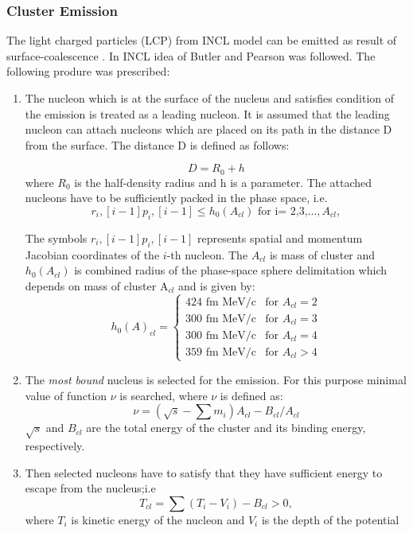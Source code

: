 \subsubsection{Cluster Emission}
The light charged particles (LCP) from INCL model can be emitted as result of  surface-coalescence \cite{INCLboudard2013new}. In INCL idea of  Butler and Pearson\cite{Butler1963} was followed. The following produre was prescribed:
\begin{enumerate}[label=(\roman*)]
	
	\item The nucleon which is at the surface of the nucleus and satisfies condition of the emission is treated as a leading nucleon. It is assumed that the leading nucleon can attach nucleons which are placed on its path in the distance D from the surface. The distance D is defined as follows:
	
	\begin{equation}
		D=R_{0}+h
	\end{equation} 
	where $R_{0}$ is the half-density radius and h is a parameter. The attached nucleons have to be sufficiently packed in the phase space, i.e. 
	\begin{equation}
		r_i,[i-1]p_i,[i-1]\leq h_0\left(A_{cl}\right) \text{  for i= 2,3,}..., A_{cl},
	\end{equation} 
	
	The symbols $r_i,[i-1]p_i,[i-1]$  represents spatial and momentum Jacobian coordinates of the $i$-th nucleon.  The $A_{cl}$ is mass of cluster and $h_0\left(A_{cl}\right)$ is combined radius of the phase-space sphere delimitation which depends on mass of cluster A$_{cl}$ and is given by:
	\begin{equation}
		h_{0}(A)_{cl}= \begin{cases} 424 \text{ fm MeV/c} &  \text{for }A_{cl}=2\\ 
			300 \text{ fm MeV/c} &  \text{for }A_{cl}=3\\ 
			300 \text{ fm MeV/c} &  \text{for }A_{cl}=4\\ 
			359 \text{ fm MeV/c} &  \text{for }A_{cl}>4 \end{cases} 
	\end{equation}
	\item The \textit{most bound} nucleus is selected for the emission. For this purpose minimal value of function $\nu$ is searched, where $\nu$ is defined as:
	\begin{equation}
		\nu=\left(\sqrt{s}-\sum m_i\right)A_{cl}- B_{cl}/A_{cl} 
	\end{equation}
    $\sqrt{s}$ and $B_{cl}$ are the total energy of the cluster and its binding energy, respectively.
	\item Then selected nucleons have to satisfy that they have sufficient energy to escape from the nucleus;i.e 
	\begin{equation}
		T_{cl}=\sum\left(T_i-V_i\right)-B_{cl}>0,
	\end{equation}
	where $T_i$ is kinetic energy of the nucleon and $V_i$ is the depth of the potential
	

\end{enumerate}
